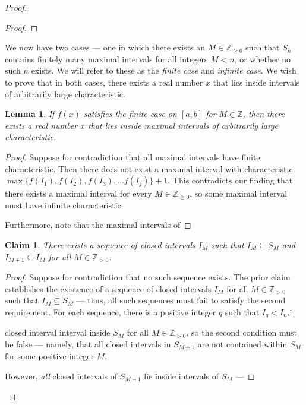 \documentclass[11pt]{article}
\newtheorem{lemma}{Lemma}
\newtheorem*{claim*}{Claim}
\begin{document}
\begin{proof}
\begin{adjustwidth}{1cm}{}
\begin{proof}
    \end{proof}
\end{adjustwidth}




We now have two cases --- one in which there exists an $M \in \mathbb{Z}_{\ge 0}$ such that $S_n$ contains finitely many maximal intervals for all integers $M < n$, or whether no such $n$ exists. We will refer to these as the \textit{finite case} and \textit{infinite case}. We wish to prove that in both cases, there exists a real number $x$ that lies inside intervals of arbitrarily large characteristic.

\begin{adjustwidth}{1cm}{}
	\begin{lemma}
		If $f(x)$ satisfies the finite case on $[a, b]$ for $M \in \mathbb{Z}$, then there exists a real number $x$ that lies inside maximal intervals of arbitrarily large characteristic.
	\end{lemma}
    \begin{proof}\renewcommand{\qedsymbol}{}
		Suppose for contradiction that all maximal intervals have finite characteristic. Then there does not exist a maximal interval with characteristic \\ $\max \{ f(I_1), f(I_2), f(I_3), \ldots f(I_j) \} + 1$. This contradicts our finding that there exists a maximal interval for every $M \in \mathbb{Z}_{\ge 0}$, so some maximal interval must have infinite characteristic.

		Furthermore, note that the maximal intervals of
	\end{proof}
\end{adjustwidth}





\begin{adjustwidth}{1cm}{}
	\begin{claim*}
		There exists a sequence of closed intervals $I_M$ such that $I_M \subseteq S_M$ and $I_{M+1} \subseteq I_M$ for all $M \in \mathbb{Z}_{>0}$.
	\end{claim*}
    \begin{proof}\renewcommand{\qedsymbol}{}
		Suppose for contradiction that no such sequence exists. The prior claim establishes the existence of a sequence of closed intervals $I_M$ for all $M \in \mathbb{Z}_{>0}$ such that $I_M \subseteq S_M$ --- thus, all such sequences must fail to satisfy the second requirement. For each sequence, there is a positive integer $q$ such that $I_q < I_n$.i

		closed interval interval inside $S_M$ for all $M \in \mathbb{Z}_{>0}$, so the second condition must be false --- namely, that all closed intervals in $S_{M+1}$ are not contained within $S_M$ for some positive integer $M$.

		However, \textit{all} closed intervals of $S_{M+1}$ lie inside intervals of $S_{M}$ ---

	\end{proof}
\end{adjustwidth}

\end{proof} 
\end{document}
